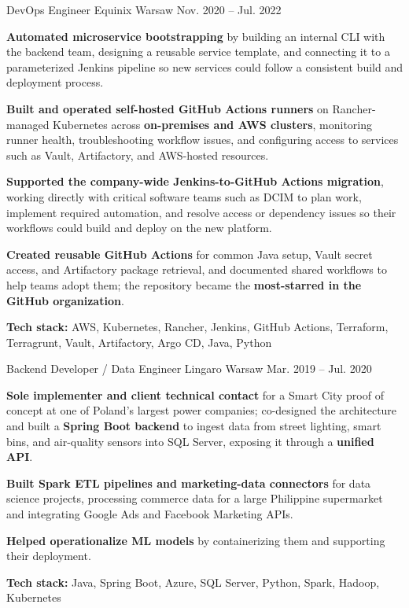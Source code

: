 \begin{cventries}
  \cventry
    {DevOps Engineer}
    {Equinix}
    {Warsaw}
    {Nov. 2020 -- Jul. 2022}
    {
      \begin{cvitems}
        \item {\textbf{Automated microservice bootstrapping} by building an internal CLI with the backend team, designing a reusable service template, and connecting it to a parameterized Jenkins pipeline so new services could follow a consistent build and deployment process.}
        \item {\textbf{Built and operated self-hosted GitHub Actions runners} on Rancher-managed Kubernetes across \textbf{on-premises and AWS clusters}, monitoring runner health, troubleshooting workflow issues, and configuring access to services such as Vault, Artifactory, and AWS-hosted resources.}
        \item {\textbf{Supported the company-wide Jenkins-to-GitHub Actions migration}, working directly with critical software teams such as DCIM to plan work, implement required automation, and resolve access or dependency issues so their workflows could build and deploy on the new platform.}
        \item {\textbf{Created reusable GitHub Actions} for common Java setup, Vault secret access, and Artifactory package retrieval, and documented shared workflows to help teams adopt them; the repository became the \textbf{most-starred in the GitHub organization}.}
        \item {\textbf{Tech stack:} AWS, Kubernetes, Rancher, Jenkins, GitHub Actions, Terraform, Terragrunt, Vault, Artifactory, Argo CD, Java, Python}
      \end{cvitems}
    }

  \cventry
    {Backend Developer / Data Engineer}
    {Lingaro}
    {Warsaw}
    {Mar. 2019 -- Jul. 2020}
    {
      \begin{cvitems}
        \item {\textbf{Sole implementer and client technical contact} for a Smart City proof of concept at one of Poland’s largest power companies; co-designed the architecture and built a \textbf{Spring Boot backend} to ingest data from street lighting, smart bins, and air-quality sensors into SQL Server, exposing it through a \textbf{unified API}.}
        \item {\textbf{Built Spark ETL pipelines and marketing-data connectors} for data science projects, processing commerce data for a large Philippine supermarket and integrating Google Ads and Facebook Marketing APIs.}
        \item {\textbf{Helped operationalize ML models} by containerizing them and supporting their deployment.}
        \item {\textbf{Tech stack:} Java, Spring Boot, Azure, SQL Server, Python, Spark, Hadoop, Kubernetes}
      \end{cvitems}
    }


\end{cventries}
